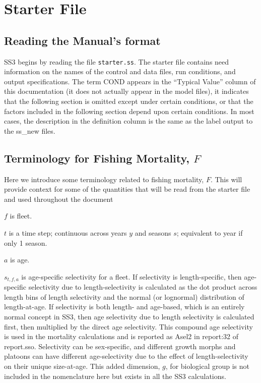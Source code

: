 
\section{Starter File}

\subsection{Reading the Manual's format}
SS3 begins by reading the file \texttt{starter.ss}. The starter file contains need information on the names of the control and data files, run conditions, and output specifications. The term COND appears in the ``Typical Value'' column of this documentation (it does not actually appear in the model files), it indicates that the following section is omitted except under certain conditions, or that the factors included in the following section depend upon certain conditions. In most cases, the description in the definition column is the same as the label output to the ss\_new files.

\subsection{Terminology for Fishing Mortality, $F$}
Here we introduce some terminology related to fishing mortality, $F$. This will provide context for some of the quantities that will be read from the starter file and used throughout the document

$f$ is fleet.

$t$ is a time step; continuous across years $y$ and seasons $s$; equivalent to year if only 1 season.

$a$ is age.

$s_{t,f,a}$ is age-specific selectivity for a fleet. If selectivity is length-specific, then age-specific selectivity due to length-selectivity is calculated as the dot product across length bins of length selectivity and the normal (or lognormal) distribution of length-at-age. If selectivity is both length- and age-based, which is an entirely normal concept in SS3, then age selectivity due to length selectivity is calculated first, then multiplied by the direct age selectivity. This compound age selectivity is used in the mortality calculations and is reported as Asel2 in report:32 of report.sso. Selectivity can be sex-specific, and different growth morphs and platoons can have different age-selectivity due to the effect of length-selectivity on their unique size-at-age. This added dimension, $g$, for biological group is not included in the nomenclature here but exists in all the SS3 calculations.

